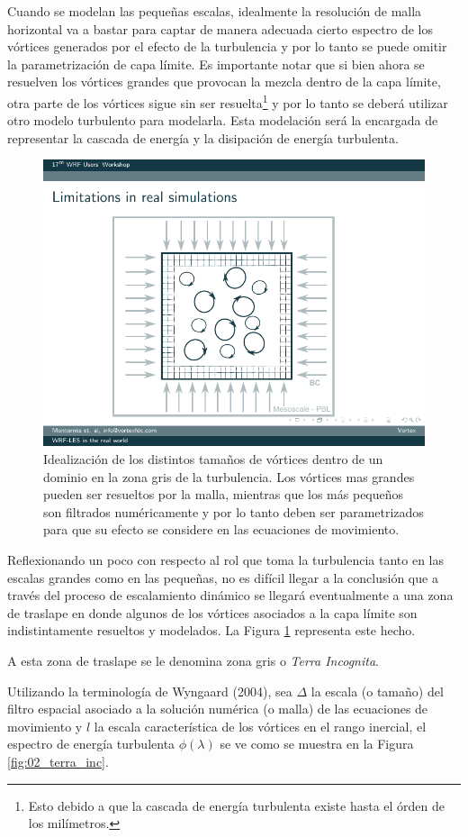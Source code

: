 Cuando se modelan las pequeñas escalas, idealmente la resolución de malla horizontal va a bastar para captar de manera adecuada cierto espectro de los vórtices generados por el efecto de la turbulencia y por lo tanto se puede omitir la parametrización de capa límite. Es importante notar que si bien ahora se resuelven los vórtices grandes que provocan la mezcla dentro de la capa límite, otra parte de los vórtices sigue sin ser resuelta\footnote{Esto debido a que la cascada de energía turbulenta existe hasta el órden de los milímetros.} y por lo tanto se deberá utilizar otro modelo turbulento para modelarla. Esta modelación será la encargada de representar la cascada de energía y la disipación de energía turbulenta.

\begin{figure}[h!]
	\centering
	\includegraphics[width=0.5\linewidth,trim={2.67cm 1.35cm 3.1cm 2.25cm},clip]{Imagenes/02/grid}
	\caption{Idealización de los distintos tamaños de vórtices dentro de un dominio en la zona gris de la turbulencia. Los vórtices mas grandes pueden ser resueltos por la malla, mientras que los más pequeños son filtrados numéricamente y por lo tanto deben ser parametrizados para que su efecto se considere en las ecuaciones de movimiento.}
	\label{fig:02_grid_vortex}
\end{figure}

Reflexionando un poco con respecto al rol que toma la turbulencia tanto en las escalas grandes como en las pequeñas, no es difícil llegar a la conclusión que a través del proceso de escalamiento dinámico se llegará eventualmente a una zona de traslape en donde algunos de los vórtices asociados a la capa límite son indistintamente resueltos y modelados. La Figura \ref{fig:02_grid_vortex} representa este hecho. 

A esta zona de traslape se le denomina zona gris o \emph{Terra Incognita}.

Utilizando la terminología de Wyngaard (2004), sea $\Delta$ la escala (o tamaño) del filtro espacial asociado a la solución numérica (o malla) de las ecuaciones de movimiento y $l$ la escala característica de los vórtices en el rango inercial, el espectro de energía turbulenta $\phi(\lambda)$ se ve como se muestra en la Figura \ref{fig:02_terra_inc}.

